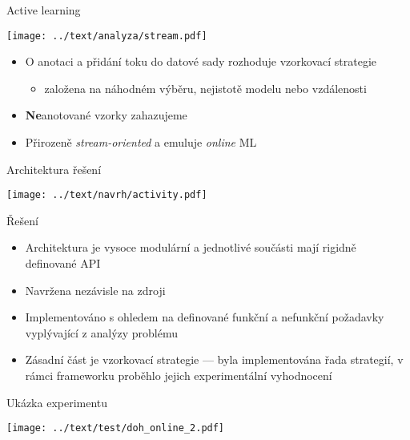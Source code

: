 \documentclass{beamer}
\begin{document}
\begin{frame}{Active learning}
    \begin{center}
    \texttt{[image: ../text/analyza/stream.pdf]}
    \end{center}
    \begin{itemize}
        \item O anotaci a přidání toku do datové sady rozhoduje vzorkovací strategie
        \begin{itemize}
            \item založena na náhodném výběru, nejistotě modelu nebo vzdálenosti
        \end{itemize}
        \item \textbf{Ne}anotované vzorky zahazujeme
        \item Přirozeně \textit{stream-oriented} a emuluje \textit{online} ML
    \end{itemize}    
\end{frame}


\begin{frame}{Architektura řešení}
\begin{center}
\texttt{[image: ../text/navrh/activity.pdf]}
\end{center}

\end{frame}

\begin{frame}{Řešení}
    \begin{itemize}
        \item Architektura je vysoce modulární a jednotlivé součásti mají rigidně definované API
        \item Navržena nezávisle na zdroji
        \item Implementováno s ohledem na definované funkční a nefunkční požadavky vyplývající z analýzy problému
        \item Zásadní část je vzorkovací strategie --- byla implementována řada strategií, v rámci frameworku proběhlo jejich experimentální vyhodnocení
    \end{itemize}
\end{frame}

\begin{frame}{Ukázka experimentu}
\begin{center}
\texttt{[image: ../text/test/doh\_online\_2.pdf]}
\end{center}



\end{frame}
\end{document}
